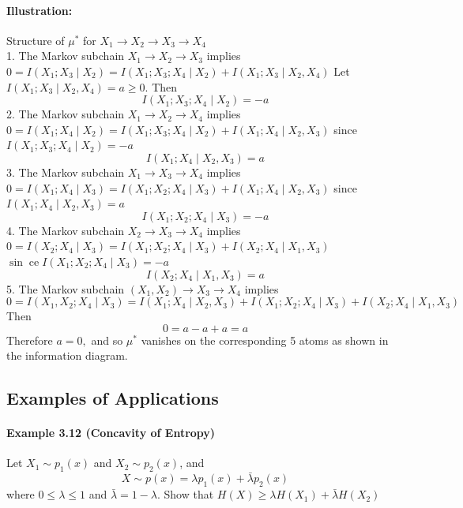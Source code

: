 \documentclass[8pt]{article}
\begin{document}
\paragraph{Illustration:} Structure of $\mu^{*}$ for $X_{1} \rightarrow X_{2} \rightarrow X_{3} \rightarrow X_{4}$
\\
1. The Markov subchain $X_{1} \rightarrow X_{2} \rightarrow X_{3}$ implies
$0=I\left(X_{1} ; X_{3} \mid X_{2}\right)=I\left(X_{1} ; X_{3} ; X_{4} \mid X_{2}\right)+I\left(X_{1} ; X_{3} \mid X_{2}, X_{4}\right)$
Let $I\left(X_{1} ; X_{3} \mid X_{2}, X_{4}\right)=a \geq 0 .$ Then
$$
I\left(X_{1} ; X_{3} ; X_{4} \mid X_{2}\right)=-a
$$
2. The Markov subchain $X_{1} \rightarrow X_{2} \rightarrow X_{4}$ implies
$0=I\left(X_{1} ; X_{4} \mid X_{2}\right)=I\left(X_{1} ; X_{3} ; X_{4} \mid X_{2}\right)+I\left(X_{1} ; X_{4} \mid X_{2}, X_{3}\right)$
since $I\left(X_{1} ; X_{3} ; X_{4} \mid X_{2}\right)=-a$
$$
I\left(X_{1} ; X_{4} \mid X_{2}, X_{3}\right)=a
$$
3. The Markov subchain $X_{1} \rightarrow X_{3} \rightarrow X_{4}$ implies
$0=I\left(X_{1} ; X_{4} \mid X_{3}\right)=I\left(X_{1} ; X_{2} ; X_{4} \mid X_{3}\right)+I\left(X_{1} ; X_{4} \mid X_{2}, X_{3}\right)$
since $I\left(X_{1} ; X_{4} \mid X_{2}, X_{3}\right)=a$
$$
I\left(X_{1} ; X_{2} ; X_{4} \mid X_{3}\right)=-a
$$
4. The Markov subchain $X_{2} \rightarrow X_{3} \rightarrow X_{4}$ implies
$0=I\left(X_{2} ; X_{4} \mid X_{3}\right)=I\left(X_{1} ; X_{2} ; X_{4} \mid X_{3}\right)+I\left(X_{2} ; X_{4} \mid X_{1}, X_{3}\right)$
$\sin \operatorname{ce} I\left(X_{1} ; X_{2} ; X_{4} \mid X_{3}\right)=-a$
$$
I\left(X_{2} ; X_{4} \mid X_{1}, X_{3}\right)=a
$$
5. The Markov subchain $\left(X_{1}, X_{2}\right) \rightarrow X_{3} \rightarrow X_{4}$ implies
$$
0=I\left(X_{1}, X_{2} ; X_{4} \mid X_{3}\right)=
I\left(X_{1} ; X_{4} \mid X_{2}, X_{3}\right)+I\left(X_{1} ; X_{2} ; X_{4} \mid X_{3}\right)+I\left(X_{2} ; X_{4} \mid X_{1}, X_{3}\right)
$$
Then
$$
0=a-a+a=a
$$
Therefore $a=0,$ and so $\mu^{*}$ vanishes on the corresponding 5 atoms as shown in the information diagram.

\newpage
\subsection{Examples of Applications}
\begin{tcolorbox}
\paragraph{Example 3.12 (Concavity of Entropy)} Let $X_{1} \sim p_{1}(x)$ and $X_{2} \sim p_{2}(x)$, and
$$
X \sim p(x)=\lambda p_{1}(x)+\bar{\lambda} p_{2}(x)
$$
where $0 \leq \lambda \leq 1$ and $\bar{\lambda}=1-\lambda$. Show that
$
H(X) \geq \lambda H\left(X_{1}\right)+\bar{\lambda} H\left(X_{2}\right)
$
\end{tcolorbox}
\end{document}
